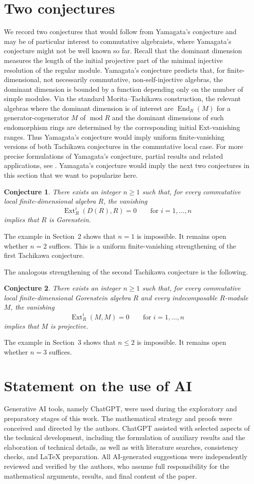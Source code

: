 \documentclass[a4paper]{amsart}
\newtheorem*{conjecture}{Conjecture}
\theoremstyle{definition}
\theoremstyle{remark}
\numberwithin{equation}{section}
\renewcommand{\mod}{\operatorname{mod}}
\newcommand{\Ext}{\operatorname{Ext}}
\newcommand{\End}{\operatorname{End}}
\begin{document}
\section{Two conjectures}
We record two conjectures that would follow from Yamagata's conjecture and may be of particular interest to commutative algebraists, where Yamagata's conjecture might not be well known so far. Recall that the dominant dimension measures the length of the initial projective part of the minimal injective resolution of the regular module. Yamagata's conjecture predicts that, for finite-dimensional, not necessarily commutative, non-self-injective algebras, the dominant dimension is bounded by a function depending only on the number of simple modules. Via the standard Morita--Tachikawa construction, the relevant algebras where the dominant dimension is of interest are $\End_R(M)$ for a generator-cogenerator $M$ of $\mod R$ and the dominant dimensions of such endomorphism rings are determined by the corresponding initial Ext-vanishing ranges. Thus Yamagata's conjecture would imply uniform finite-vanishing versions of both Tachikawa conjectures in the commutative local case. For more precise formulations of Yamagata's conjecture, partial results and related applications, see \cite{Y,M,CFKKY}.
Yamagata's conjecture would imply the next two conjectures in this section that we want to popularize here.
\begin{conjecture}
There exists an integer $n\geq1$ such that, for every commutative local finite-dimensional algebra $R$, the vanishing
\[
 \Ext_R^i(D(R),R)=0\qquad\text{for }i=1,\ldots,n
\]
implies that $R$ is Gorenstein.
\end{conjecture}
The example in Section~2 shows that $n=1$ is impossible. It remains open whether $n=2$ suffices. This is a uniform finite-vanishing strengthening of the first Tachikawa conjecture.

The analogous strengthening of the second Tachikawa conjecture is the following.
\begin{conjecture}
There exists an integer $n\geq1$ such that, for every commutative local finite-dimensional Gorenstein algebra $R$ and every indecomposable $R$-module $M$, the vanishing
\[
 \Ext_R^i(M,M)=0\qquad\text{for }i=1,\ldots,n
\]
implies that $M$ is projective.
\end{conjecture}
The example in Section~3 shows that $n\leq2$ is impossible. It remains open whether $n=3$ suffices.


\section*{Statement on the use of AI}
Generative AI tools, namely ChatGPT, were used during the
exploratory and preparatory stages of this work. The mathematical strategy and proofs were conceived and directed by the authors.
ChatGPT assisted with selected aspects of the technical development, including
the formulation of auxiliary results and the elaboration of technical details,
as well as with literature searches, consistency checks, and \LaTeX{}
preparation. All AI-generated suggestions were independently reviewed and
verified by the authors, who assume full responsibility for the mathematical
arguments, results, and final content of the paper.
\end{document}
